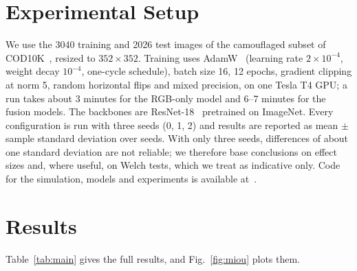 \documentclass[runningheads]{llncs}
\begin{document}
\section{Experimental Setup}
We use the 3040 training and 2026 test images of the camouflaged subset of COD10K~\cite{sinet}, resized to $352\times352$. Training uses AdamW~\cite{adamw} (learning rate $2\times10^{-4}$, weight decay $10^{-4}$, one-cycle schedule), batch size 16, 12 epochs, gradient clipping at norm 5, random horizontal flips and mixed precision, on one Tesla T4 GPU; a run takes about 3 minutes for the RGB-only model and 6--7 minutes for the fusion models. The backbones are ResNet-18~\cite{resnet} pretrained on ImageNet. Every configuration is run with three seeds (0, 1, 2) and results are reported as mean $\pm$ sample standard deviation over seeds. With only three seeds, differences of about one standard deviation are not reliable; we therefore base conclusions on effect sizes and, where useful, on Welch tests, which we treat as indicative only. Code for the simulation, models and experiments is available at~\cite{githubrepo}.

\section{Results}\label{sec:res}
Table~\ref{tab:main} gives the full results, and Fig.~\ref{fig:miou} plots them.
\end{document}
